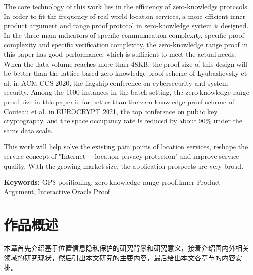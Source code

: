 \documentclass[zihao=-4]{ctexart}
\newcommand{\xiaowu}{\fontsize{9pt}{0}}
\begin{document}
\begin{spacing}{1.5}
\begin{adjustwidth}{0.42cm}{0.42cm}
The core technology of this work lies in the efficiency of zero-knowledge protocols. In order to fit the frequency of real-world location services, a more efficient inner product argument and range proof protocol in zero-knowledge system is designed. In the three main indicators of specific communication complexity, specific proof complexity and specific verification complexity, the zero-knowledge range proof in this paper has good performance, which is sufficient to meet the actual needs. When the data volume reaches more than 48KB, the proof size of this design will be better than the lattice-based zero-knowledge proof scheme of Lyubashevsky et al. in ACM CCS 2020, the flagship conference on cybersecurity and system security. Among the 1000 instances in the batch setting, the zero-knowledge range proof size in this paper is far better than the zero-knowledge proof scheme of Couteau et al. in EUROCRYPT 2021, the top conference on public key cryptography, and the space occupancy rate is reduced by about 90\% under the same data scale.\par
This work will help solve the existing pain points of location services, reshape the service concept of "Internet + location privacy protection" and improve service quality. With the growing market size, the application prospects are very broad.\par
\textbf{Keywords: }GPS positioning, zero-knowledge range proof,Inner Product Argument, Interactive Oracle Proof
\end{adjustwidth}
\end{spacing}



\clearpage
\tableofcontents
\clearpage



\renewcommand{\headrulewidth}{0.4pt} %

\chead{\xiaowu 北京航空航天大学第三十三届“冯如杯”竞赛主赛道参赛作品} %

\setcounter{page}{1} 




\section{作品概述}
本章首先介绍基于位置信息隐私保护的研究背景和研究意义，接着介绍国内外相关领域的研究现状，然后引出本文研究的主要内容，最后给出本文各章节的内容安排。
\end{document}
